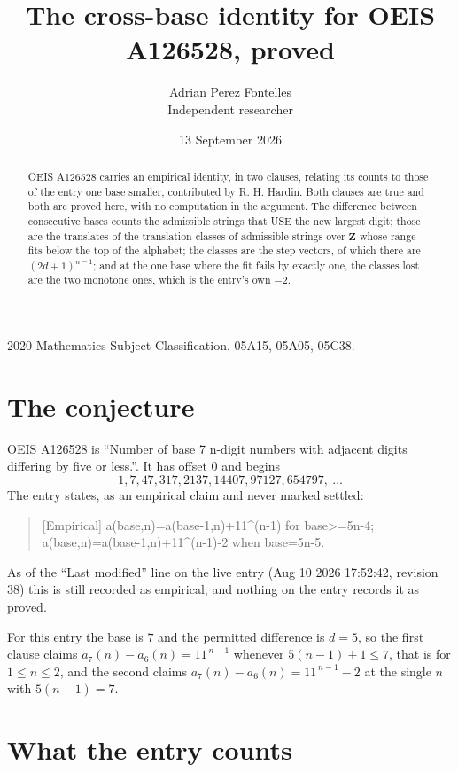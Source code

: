 \documentclass[11pt,a4paper]{article}
\title{The cross-base identity for OEIS A126528, proved}
\author{Adrian Perez Fontelles\\ \small Independent researcher}
\date{13 September 2026}
\theoremstyle{plain}
\theoremstyle{definition}
\begin{document}
\maketitle

\begin{abstract}
OEIS A126528 carries an empirical identity, in two clauses, relating its counts to those of the
entry one base smaller, contributed by R. H. Hardin. Both clauses are true and both are proved
here, with no computation in the argument. The difference between consecutive bases counts the
admissible strings that USE the new largest digit; those are the translates of the
translation-classes of admissible strings over $\mathbf{Z}$ whose range fits below the top of
the alphabet; the classes are the step vectors, of which there are $(2d+1)^{n-1}$; and at the
one base where the fit fails by exactly one, the classes lost are the two monotone ones, which
is the entry's own $-2$.
\end{abstract}

\noindent\small 2020 Mathematics Subject Classification. 05A15, 05A05, 05C38.\normalsize

\section{The conjecture}

OEIS A126528 is ``Number of base 7 n-digit numbers with adjacent digits differing by five or less.''. It has offset $0$ and begins
\[
1, 7, 47, 317, 2137, 14407, 97127, 654797,\ \dots
\]
The entry states, as an empirical claim and never marked settled:
\begin{quote}
[Empirical] a(base,n)=a(base-1,n)+11\textasciicircum{}(n-1) for base>=5n-4; a(base,n)=a(base-1,n)+11\textasciicircum{}(n-1)-2 when base=5n-5.
\end{quote}
As of the ``Last modified'' line on the live entry (Aug 10 2026 17:52:42, revision 38)
this is still recorded as empirical, and nothing on the entry records it as proved.

For this entry the base is $7$ and the permitted difference is $d=5$, so the first clause
claims $a_{7}(n)-a_{6}(n)=11^{\,n-1}$ whenever $5(n-1)+1\le7$, that is for
$1\le n\le2$, and the second claims $a_{7}(n)-a_{6}(n)=11^{\,n-1}-2$ at the single
$n$ with $5(n-1)=7$.

\section{What the entry counts}
\end{document}
